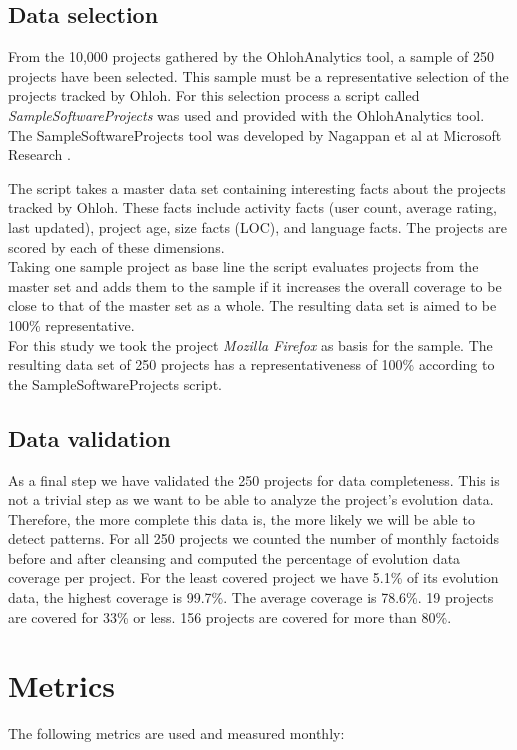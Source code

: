 \subsection{Data selection}
From the 10,000 projects gathered by the OhlohAnalytics tool, a sample of 250
projects have been selected. This sample must be a representative selection of
the projects tracked by Ohloh. For this selection process a script called
\emph{SampleSoftwareProjects }\rm was used and provided with the OhlohAnalytics
tool. The SampleSoftwareProjects tool was developed by Nagappan et al at
Microsoft Research \cite{nagappan}.

The script takes a master data set containing interesting facts about the
projects tracked by Ohloh. These facts include activity facts (user count,
average rating, last updated), project age, size facts (LOC), and language
facts. The projects are scored by each of these dimensions.\\

Taking one sample project as base line the script evaluates projects from the
master set and adds them to the sample if it increases the overall coverage to
be close to that of the master set as a whole. The resulting data set is aimed
to be 100\% representative.\\

\noindent
For this study we took the project \emph{Mozilla Firefox }\rm as basis for
the sample. The resulting data set of 250 projects has a representativeness of
100\% according to the SampleSoftwareProjects script.

\subsection{Data validation}
As a final step we have validated the 250 projects for data completeness. This
is not a trivial step as we want to be able to analyze the project's evolution
data. Therefore, the more complete this data is, the more likely we will be able
to detect patterns. For all 250 projects we counted the number of monthly
factoids before and after cleansing and computed the percentage of evolution
data coverage per project. For the least covered project we have 5.1\% of its
evolution data, the highest coverage is 99.7\%. The average coverage is 78.6\%.
19 projects are covered for 33\% or less. 156 projects are covered for more than
80\%.

\section{Metrics}
The following metrics are used and measured monthly:

